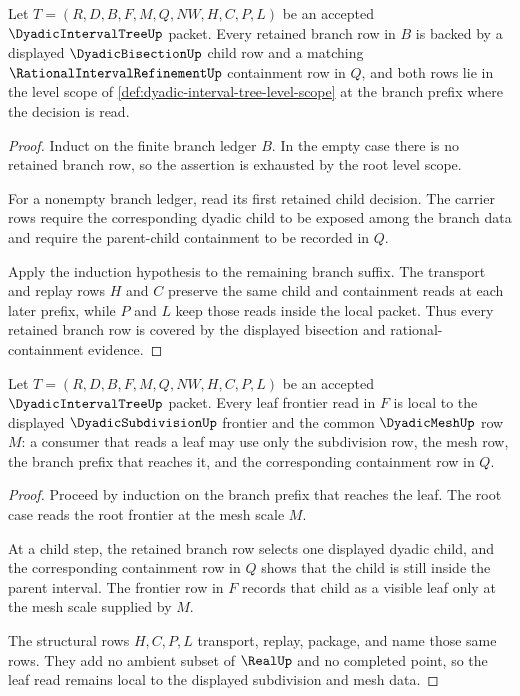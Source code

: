 \begin{theorem}
\label{thm:dyadic-interval-tree-branch-coverage}
Let $T=(R,D,B,F,M,Q,NW,H,C,P,L)$ be an accepted $\DyadicIntervalTreeUp$ packet. Every retained branch row in $B$ is backed by a displayed $\DyadicBisectionUp$ child row and a matching $\RationalIntervalRefinementUp$ containment row in $Q$, and both rows lie in the level scope of \autoref{def:dyadic-interval-tree-level-scope} at the branch prefix where the decision is read.
\end{theorem}
\begin{proof}
Induct on the finite branch ledger $B$. In the empty case there is no retained branch row, so the assertion is exhausted by the root level scope.

For a nonempty branch ledger, read its first retained child decision. The carrier rows require the corresponding dyadic child to be exposed among the branch data and require the parent-child containment to be recorded in $Q$.

Apply the induction hypothesis to the remaining branch suffix. The transport and replay rows $H$ and $C$ preserve the same child and containment reads at each later prefix, while $P$ and $L$ keep those reads inside the local packet. Thus every retained branch row is covered by the displayed bisection and rational-containment evidence.
\end{proof}

\begin{theorem}
\label{thm:dyadic-interval-tree-leaf-locality}
Let $T=(R,D,B,F,M,Q,NW,H,C,P,L)$ be an accepted $\DyadicIntervalTreeUp$ packet. Every leaf frontier read in $F$ is local to the displayed $\DyadicSubdivisionUp$ frontier and the common $\DyadicMeshUp$ row $M$: a consumer that reads a leaf may use only the subdivision row, the mesh row, the branch prefix that reaches it, and the corresponding containment row in $Q$.
\end{theorem}
\begin{proof}
Proceed by induction on the branch prefix that reaches the leaf. The root case reads the root frontier at the mesh scale $M$.

At a child step, the retained branch row selects one displayed dyadic child, and the corresponding containment row in $Q$ shows that the child is still inside the parent interval. The frontier row in $F$ records that child as a visible leaf only at the mesh scale supplied by $M$.

The structural rows $H,C,P,L$ transport, replay, package, and name those same rows. They add no ambient subset of $\RealUp$ and no completed point, so the leaf read remains local to the displayed subdivision and mesh data.
\end{proof}

